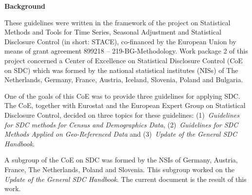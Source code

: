 	
	\vfill %
	
	\newpage 

\noindent \textbf{\large Background}\bigskip

\noindent These guidelines were written in the framework of the project on Statistical Methods and Tools for Time Series, Seasonal Adjustment and Statistical Disclosure Control (in short: STACE), co-financed by the European Union by means of grant agreement 899218 -- 219-BG-Methodology. Work package 2 of this project concerned a Center of Excellence on Statistical Disclosure Control (CoE on SDC) which was formed by the national statistical institutes (NISs) of The Netherlands, Germany, France, Austria, Iceland, Slovenia, Poland and Bulgaria.

One of the goals of this CoE was to provide three guidelines for applying SDC. The CoE, together with Eurostat and the European Expert Group on Statistical Disclosure Control, decided on three topics for these guidelines: (1)~\textit{Guidelines for SDC methods for Census and Demographics Data}, (2)~\textit{Guidelines for SDC Methods Applied on Geo-Referenced Data} and (3)~\textit{Update of the General SDC Handbook}.

A subgroup of the CoE on SDC was formed by the NSIs of Germany, Austria, France, The Netherlands, Poland and Slovenia. This subgroup worked on the \textit{Update of the General SDC Handbook}. The current document is the result of this work.

\vfill
